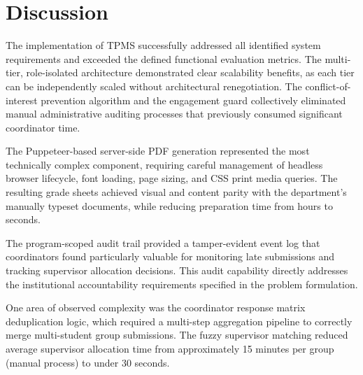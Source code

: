 \section{Discussion}
The implementation of TPMS successfully addressed all identified system requirements and exceeded the defined functional evaluation metrics. The multi-tier, role-isolated architecture demonstrated clear scalability benefits, as each tier can be independently scaled without architectural renegotiation. The conflict-of-interest prevention algorithm and the engagement guard collectively eliminated manual administrative auditing processes that previously consumed significant coordinator time.

The Puppeteer-based server-side PDF generation represented the most technically complex component, requiring careful management of headless browser lifecycle, font loading, page sizing, and CSS print media queries. The resulting grade sheets achieved visual and content parity with the department's manually typeset documents, while reducing preparation time from hours to seconds.

The program-scoped audit trail provided a tamper-evident event log that coordinators found particularly valuable for monitoring late submissions and tracking supervisor allocation decisions. This audit capability directly addresses the institutional accountability requirements specified in the problem formulation.

One area of observed complexity was the coordinator response matrix deduplication logic, which required a multi-step aggregation pipeline to correctly merge multi-student group submissions. The fuzzy supervisor matching reduced average supervisor allocation time from approximately 15 minutes per group (manual process) to under 30 seconds.

